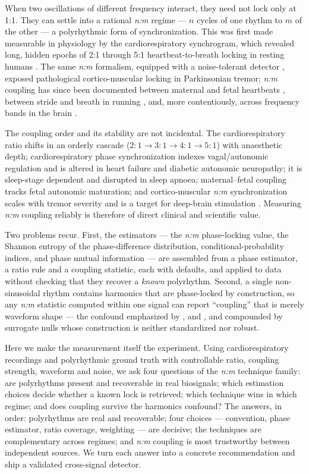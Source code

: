 \documentclass[11pt]{article}
\begin{document}
When two oscillations of different frequency interact, they need not lock only at 1:1. They can settle
into a rational \textit{n:m} regime --- $n$ cycles of one rhythm to $m$ of the other --- a polyrhythmic
form of synchronization. This was first made measurable in physiology by the cardiorespiratory
synchrogram, which revealed long, hidden epochs of 2:1 through 5:1 heartbeat-to-breath locking in
resting humans \citep{schafer1998,schafer1999}. The same \textit{n:m} formalism, equipped with a
noise-tolerant detector \citep{tass1998}, exposed pathological cortico-muscular locking in Parkinsonian
tremor; \textit{n:m} coupling has since been documented between maternal and fetal heartbeats
\citep{vanleeuwen2009}, between stride and breath in running \citep{bramble1983}, and, more
contentiously, across frequency bands in the brain \citep{palva2005,belluscio2012}.

The coupling order and its stability are not incidental. The cardiorespiratory ratio shifts in an
orderly cascade ($2{:}1\to3{:}1\to4{:}1\to5{:}1$) with anaesthetic depth; cardiorespiratory phase
synchronization indexes vagal/autonomic regulation and is altered in heart failure and diabetic
autonomic neuropathy; it is sleep-stage dependent and disrupted in sleep apnoea; maternal--fetal
coupling tracks fetal autonomic maturation; and cortico-muscular \textit{n:m} synchronization scales
with tremor severity and is a target for deep-brain stimulation \citep{schnitzler2005,purdon2013}.
Measuring \textit{n:m} coupling reliably is therefore of direct clinical and scientific value.

Two problems recur. First, the estimators --- the \textit{n:m} phase-locking value, the Shannon entropy
of the phase-difference distribution, conditional-probability indices, and phase mutual information ---
are assembled from a phase estimator, a ratio rule and a coupling statistic, each with defaults, and
applied to data without checking that they recover a \emph{known} polyrhythm. Second, a single
non-sinusoidal rhythm contains harmonics that are phase-locked by construction, so any \textit{n:m}
statistic computed within one signal can report ``coupling'' that is merely waveform shape ---
the confound emphasized by \citet{aru2015}, \citet{schefferteixeira2016} and \citet{cole2017}, and
compounded by surrogate nulls whose construction is neither standardized nor robust.

Here we make the measurement itself the experiment. Using cardiorespiratory recordings and polyrhythmic
ground truth with controllable ratio, coupling strength, waveform and noise, we ask four questions of the
\textit{n:m} technique family: are polyrhythms present and recoverable in real biosignals; which
estimation choices decide whether a known lock is retrieved; which technique wins in which regime; and
does coupling survive the harmonics confound? The answers, in order: polyrhythms are real and recoverable;
four choices --- convention, phase estimator, ratio coverage, weighting --- are decisive; the techniques
are complementary across regimes; and \textit{n:m} coupling is most trustworthy between independent
sources. We turn each answer into a concrete recommendation and ship a validated cross-signal detector.
\end{document}
